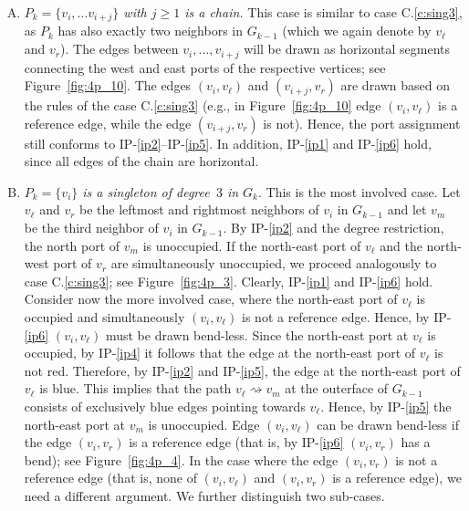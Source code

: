 \documentclass[a4paper,twoside,11pt]{article}
\begin{document}
\begin{enumerate}[C.1:]
\item \label{c:chain} \emph{$P_k=\{v_i,\ldots v_{i+j}\}$ with $j
\geq 1$ is a chain.} This case is similar to case C.\ref{c:sing3},
as $P_k$ has also exactly two neighbors in $G_{k-1}$ (which we again
denote by $v_\ell$ and $v_r$). The edges between $v_i,\ldots
,v_{i+j}$ will be drawn as horizontal segments connecting the west
and east ports of the respective vertices; see
Figure~\ref{fig:4p_10}. The edges $(v_i,v_\ell)$ and $(v_{i+j},v_r)$
are drawn based on the rules of the case C.\ref{c:sing3} (e.g., in
Figure~\ref{fig:4p_10} edge $(v_i,v_\ell)$ is a reference edge, while
the edge $(v_{i+j},v_r)$ is not). Hence, the port assignment still
conforms to IP-\ref{ip2}--IP-\ref{ip5}. In addition, IP-\ref{ip1}
and IP-\ref{ip6} hold, since all edges of the chain are horizontal.

\item \label{c:sing4} \emph{$P_k = \{v_i\}$ is a singleton of
degree~$3$ in $G_k$}. This is the most involved case. Let $v_\ell$
and $v_r$ be the leftmost and rightmost neighbors of $v_i$ in
$G_{k-1}$ and let $v_m$ be the third neighbor of $v_i$ in $G_{k-1}$.
By IP-\ref{ip2} and the degree restriction, the north port of $v_m$
is unoccupied. If the north-east port of $v_\ell$ and the north-west
port of $v_r$ are simultaneously unoccupied, we proceed analogously
to case C.\ref{c:sing3}; see Figure~\ref{fig:4p_3}.
Clearly, IP-\ref{ip1} and IP-\ref{ip6} hold. Consider now the more
involved case, where the north-east port of $v_\ell$ is occupied and
simultaneously $(v_i,v_\ell)$ is not a reference edge. Hence, by
IP-\ref{ip6} $(v_i,v_\ell)$ must be drawn bend-less. Since the
north-east port at $v_\ell$ is occupied, by IP-\ref{ip4} it follows
that the edge at the north-east port of $v_\ell$ is not red.
Therefore, by IP-\ref{ip2} and IP-\ref{ip5}, the edge at the
north-east port of $v_\ell$ is blue. This implies that the path
$v_\ell \rightsquigarrow v_m$ at the outerface of $G_{k-1}$ consists
of exclusively blue edges pointing towards $v_\ell$. Hence, by
IP-\ref{ip5} the north-east port at $v_m$ is unoccupied. Edge
$(v_i,v_\ell)$ can be drawn bend-less if the edge $(v_i,v_r)$ is
a reference edge (that is, by IP-\ref{ip6} $(v_i,v_r)$ has a bend);
see Figure~\ref{fig:4p_4}. In the case where the edge $(v_i,v_r)$ is not
a reference edge (that is, none of $(v_i,v_\ell)$ and $(v_i,v_r)$ is
a reference edge), we need a different argument.
We further distinguish two sub-cases.


\end{enumerate}
\end{document}
